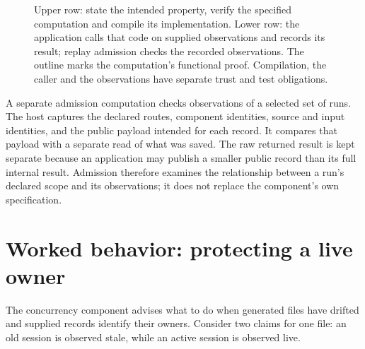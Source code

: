 \documentclass[11pt]{article}
\begin{document}
\begin{figure}[t]
\centering
{}
\caption{Upper row: state the intended property, verify the specified computation
and compile its implementation. Lower row: the application calls that code on
supplied observations and records its result; replay admission checks the
recorded observations. The outline marks the computation's functional proof.
Compilation, the caller and the observations have separate trust and test
obligations.}
\label{fig:chain}
\end{figure}

A separate admission computation checks observations of a selected set of runs.
The host captures the declared routes, component identities, source and input
identities, and the public payload intended for each record. It compares that
payload with a separate read of what was saved. The raw returned result is kept
separate because an application may publish a smaller public record than its
full internal result. Admission therefore examines the relationship between a
run's declared scope and its observations; it does not replace the component's
own specification.

\section{Worked behavior: protecting a live owner}
\label{sec:ownership}
The concurrency component advises what to do when generated files have drifted
and supplied records identify their owners. Consider two claims for one file:
an old session is observed stale, while an active session is observed live.
\end{document}

